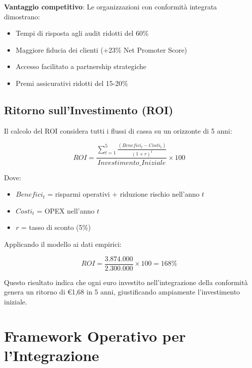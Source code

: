 \textbf{Vantaggio competitivo}: Le organizzazioni con conformità integrata dimostrano:
\begin{itemize}
    \item Tempi di risposta agli audit ridotti del 60\%
    \item Maggiore fiducia dei clienti (+23\% Net Promoter Score)
    \item Accesso facilitato a partnership strategiche
    \item Premi assicurativi ridotti del 15-20\%
\end{itemize}

\subsection{\texorpdfstring{Ritorno sull'Investimento (ROI)}{4.5.2 - Ritorno sull'Investimento (ROI)}}
\label{subsec:4.5.2_roi}

Il calcolo del ROI considera tutti i flussi di cassa su un orizzonte di 5 anni:

\begin{equation}
ROI = \frac{\sum_{t=1}^{5} \frac{(Benefici_t - Costi_t)}{(1+r)^t}}{Investimento\_Iniziale} \times 100
\end{equation}

Dove:
\begin{itemize}
    \item $Benefici_t$ = risparmi operativi + riduzione rischio nell'anno $t$
    \item $Costi_t$ = OPEX nell'anno $t$
    \item $r$ = tasso di sconto (5\%)
\end{itemize}

Applicando il modello ai dati empirici:

\begin{equation}
ROI = \frac{3.874.000}{2.300.000} \times 100 = 168\%
\end{equation}

Questo risultato indica che ogni euro investito nell'integrazione della conformità genera un ritorno di €1,68 in 5 anni, giustificando ampiamente l'investimento iniziale.

\section{\texorpdfstring{Framework Operativo per l'Integrazione}{4.6 - Framework Operativo per l'Integrazione}}
\label{sec:4.6_framework}

